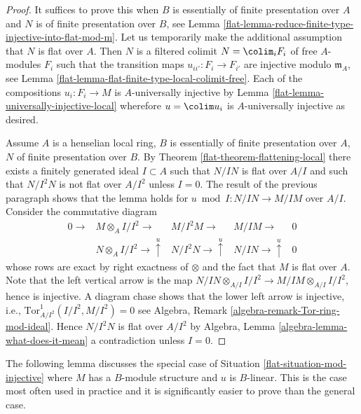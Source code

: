 \begin{proof}

It suffices to prove this when $B$ is essentially of finite presentation
over $A$ and $N$ is of finite presentation over $B$, see
Lemma \ref{flat-lemma-reduce-finite-type-injective-into-flat-mod-m}.
Let us temporarily make the additional assumption that $N$ is flat over $A$.
Then $N$ is a filtered colimit $N = \colim_i F_i$
of free $A$-modules $F_i$ such that the transition maps
$u_{ii'} : F_i \to F_{i'}$ are injective modulo $\mathfrak m_A$, see
Lemma \ref{flat-lemma-flat-finite-type-local-colimit-free}.
Each of the compositions $u_i : F_i \to M$ is $A$-universally
injective by
Lemma \ref{flat-lemma-universally-injective-local}
wherefore $u = \colim u_i$ is $A$-universally injective as desired.

\medskip\noindent
Assume $A$ is a henselian local ring, $B$ is essentially
of finite presentation over $A$, $N$ of finite presentation over $B$. By
Theorem \ref{flat-theorem-flattening-local}
there exists a finitely generated ideal $I \subset A$ such that
$N/IN$ is flat over $A/I$ and such that $N/I^2N$ is not flat over
$A/I^2$ unless $I = 0$. The result of the previous paragraph shows that
the lemma holds for $u \bmod I : N/IN \to M/IM$ over $A/I$.
Consider the commutative diagram
$$
\begin{array}{ccccc}0 \longrightarrow & M \otimes_A I/I^2 \longrightarrow & M/I^2M \longrightarrow & M/IM \longrightarrow & 0 \\  & N \otimes_A I/I^2 \longrightarrow\overset{u}{\uparrow} & N/I^2N \longrightarrow\overset{u}{\uparrow} & N/IN \longrightarrow\overset{u}{\uparrow} & 0\end{array}
$$
whose rows are exact by right exactness of $\otimes$ and the fact that
$M$ is flat over $A$. Note that the left vertical arrow is the map
$N/IN \otimes_{A/I} I/I^2 \to M/IM \otimes_{A/I} I/I^2$, hence is
injective. A diagram chase shows that the lower left arrow is injective,
i.e., $\text{Tor}^1_{A/I^2}(I/I^2, M/I^2) = 0$ see
Algebra, Remark \ref{algebra-remark-Tor-ring-mod-ideal}.
Hence $N/I^2N$ is flat over $A/I^2$ by
Algebra, Lemma \ref{algebra-lemma-what-does-it-mean}
a contradiction unless $I = 0$.
\end{proof}

The following lemma discusses the special case of
Situation \ref{flat-situation-mod-injective} where $M$ has
a $B$-module structure and $u$ is $B$-linear. This is the case most
often used in practice and it is significantly easier to prove
than the general case.

